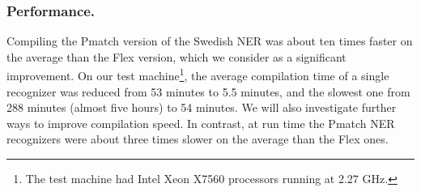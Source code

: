 \documentclass{llncs}
\begin{document}



\subsubsection{Performance.}

Compiling the Pmatch version of the Swedish NER was about ten times
faster on the average than the Flex version, which we consider as a
significant improvement. On our test
machine\footnote{The test machine had Intel Xeon X7560 processors
  running at 2.27 GHz.}, the average compilation time of
a single recognizer was reduced from 53 minutes to 5.5 minutes,
and the slowest one from 288 minutes (almost five hours) to 54 minutes.
We will also investigate further
ways to improve compilation speed. In contrast, at run time the Pmatch
NER recognizers were about three times slower on the average
than the Flex ones.
\end{document}
